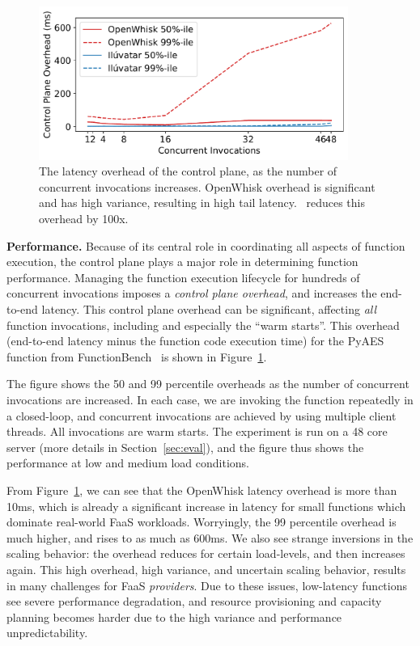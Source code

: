 \begin{figure}
  \centering
  \includegraphics[width=0.9\textwidth]{iluvatar/graphs/scaling/pyaes/overhead-scaling.pdf}
  \caption{The latency overhead of the control plane, as the number of concurrent invocations increases. 
        OpenWhisk overhead is significant and has high variance, resulting in high tail latency. 
        \sysname~reduces this overhead by 100x. }
  \label{fig:ow-scaling}
\end{figure}


\noindent \textbf{Performance.}
%
Because of its central role in coordinating all aspects of function execution, the control plane plays a major role in determining function performance. 
Managing the function execution lifecycle for hundreds of concurrent invocations imposes a \emph{control plane overhead}, and increases the end-to-end latency.
This control plane overhead can be significant, affecting \emph{all} function invocations, including and especially the ``warm starts''. 
This overhead (end-to-end latency minus the function code execution time) for the PyAES function from FunctionBench~\cite{kim2019functionbench} is shown in Figure~\ref{fig:ow-scaling}. 

The figure shows the 50 and 99 percentile overheads as the number of concurrent invocations are increased.
In each case, we are invoking the function repeatedly in a closed-loop, and concurrent invocations are achieved by using multiple client threads.
All invocations are warm starts.
The experiment is run on a 48 core server (more details in Section~\ref{sec:eval}), and the figure thus shows the performance at low and medium load conditions. 

From Figure~\ref{fig:ow-scaling}, we can see that the OpenWhisk latency overhead is more than 10ms,  which is already a significant increase in latency for small functions which dominate real-world FaaS workloads.
Worryingly, the 99 percentile overhead is much higher, and rises to as much as 600ms.
We also see strange inversions in the scaling behavior: the overhead reduces for certain load-levels, and then increases again.
This high overhead, high variance, and uncertain scaling behavior, results in many challenges for FaaS \emph{providers}. 
Due to these issues, low-latency functions see severe performance degradation, and resource provisioning and capacity planning becomes harder due to the high variance and performance unpredictability. 
%

